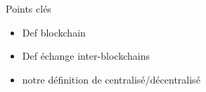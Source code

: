 Points clés 
\begin{itemize}
    \item Def blockchain
    \item Def échange inter-blockchains
    \item notre définition de  centralisé/décentralisé
\end{itemize}
